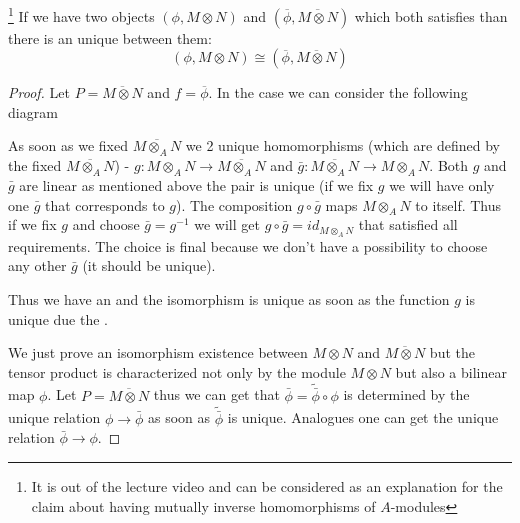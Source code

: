 \begin{lemma}
  \footnote{
    It is out of the lecture video and can be considered as an
    explanation for the claim about having mutually inverse
    homomorphisms of $A$-modules
  }
  If we have two objects $\left(\phi, M \otimes N\right)$
  and $\left(\overline{\phi},\overline{M \otimes N}\right)$
  which both satisfies  than there is
  an unique  between them: 
  \[
  \left(\phi, M \otimes N\right) \cong \left(\overline{\phi},
  \overline{M \otimes N}\right)
  \]
\begin{proof}
Let $P = \overline{M \otimes N}$ and $f =
\overline{\phi}$. In 
the case we can consider the following diagram


As soon as we fixed $\overline{ M \otimes_A N}$
we 2 unique homomorphisms (which are defined by the fixed
$\overline{ M \otimes_A N}$) - 
$g :  M \otimes_A N \to \overline{ M \otimes_A N}$
and
$\bar{g} :  \overline{M \otimes_A N} \to M \otimes_A N$.
Both $g$ and $\bar{g}$ are linear as mentioned above the pair is
unique (if we fix $g$ we will have only one $\bar{g}$ that corresponds
to $g$). The composition $g \circ \bar{g}$ maps $M \otimes_A N$ to
itself. Thus if we fix $g$ and choose $\bar{g} = g^{-1}$ we will get
$g \circ \bar{g} = id_{M \otimes_A N}$ that satisfied all
requirements. The choice is final because we don't have a possibility
to choose any other $\bar{g}$ (it should be unique).

Thus we have an
 and the isomorphism is unique as soon as the
function $g$ is unique due the .

We just prove an isomorphism existence between
$M \otimes N$ and $\overline{M \otimes N}$ but the tensor product is
characterized not only by the module $M \otimes N$
but also a bilinear map $\phi$. Let $P = \overline{M \otimes N}$ thus
we can get that $\bar{\phi} = \tilde{\bar{\phi}} \circ \phi$ is
determined by the unique
relation $\phi \to \bar{\phi}$ as soon as
$\tilde{\bar{\phi}}$ is unique.
Analogues one can get the unique relation
$\bar{\phi} \to \phi$.
\end{proof}
\label{lem:universalpropertyuniqueness}
\end{lemma}

